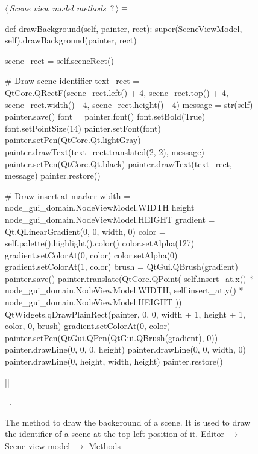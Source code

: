 \documentclass[%
    a4paper,    %
    justified,  %
    nobib,      %
    openany     %
]{tufte-book}
\makeatletter
\renewcommand{\label}[1]{\@tufte@label{##1}}%
\makeatother
\begin{document}
\begin{figure}
\begin{flushleft} \small
\begin{minipage}{\linewidth}\label{scrap91}\raggedright\small
{} $\langle\,${\itshape Scene view model methods}\nobreak\ {\footnotesize {?}}$\,\rangle\equiv$
\vspace{-1ex}
\begin{pythoncode}
def drawBackground(self, painter, rect):
    super(SceneViewModel, self).drawBackground(painter, rect)

    scene_rect = self.sceneRect()

    # Draw scene identifier
    text_rect = QtCore.QRectF(scene_rect.left()   + 4,
                              scene_rect.top()    + 4,
                              scene_rect.width()  - 4,
                              scene_rect.height() - 4)
    message = str(self)
    painter.save()
    font = painter.font()
    font.setBold(True)
    font.setPointSize(14)
    painter.setFont(font)
    painter.setPen(QtCore.Qt.lightGray)
    painter.drawText(text_rect.translated(2, 2), message)
    painter.setPen(QtCore.Qt.black)
    painter.drawText(text_rect, message)
    painter.restore()

    # Draw insert at marker
    width    = node_gui_domain.NodeViewModel.WIDTH
    height   = node_gui_domain.NodeViewModel.HEIGHT
    gradient = Qt.QLinearGradient(0, 0, width, 0)
    color    = self.palette().highlight().color()
    color.setAlpha(127)
    gradient.setColorAt(0, color)
    color.setAlpha(0)
    gradient.setColorAt(1, color)
    brush = QtGui.QBrush(gradient)
    painter.save()
    painter.translate(QtCore.QPoint(
        self.insert_at.x() * node_gui_domain.NodeViewModel.WIDTH,
        self.insert_at.y() * node_gui_domain.NodeViewModel.HEIGHT
    ))
    QtWidgets.qDrawPlainRect(painter, 0, 0, width + 1, height + 1, color, 0, brush)
    gradient.setColorAt(0, color)
    painter.setPen(QtGui.QPen(QtGui.QBrush(gradient), 0))
    painter.drawLine(0, 0, 0, height)
    painter.drawLine(0, 0, width, 0)
    painter.drawLine(0, height, width, height)
    painter.restore()

|\NWsep|
\end{pythoncode}
\vspace{1.5ex}
\footnotesize
\begin{list}{}{\setlength{\itemsep}{-\parsep}\setlength{\itemindent}{-\leftmargin}}
\item \NWtxtMacroRefIn\ .

\item{}
\end{list}
\end{minipage}\vspace{4ex}
\end{flushleft}
\caption{The method to draw the background of a scene. It is used to draw the
  identifier of a scene at the top left position of it.
  \newline{}\newline{}Editor $\rightarrow$ Scene view model $\rightarrow$
  Methods}
\label{editor:lst:scene-view-model:methods:draw-background}
\end{figure}
\end{document}

